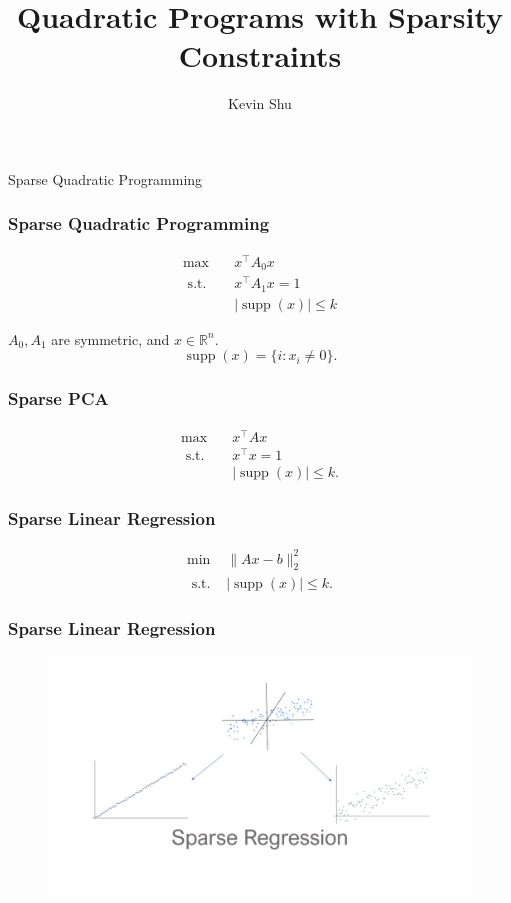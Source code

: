 \documentclass{beamer}
\title{Quadratic Programs with Sparsity Constraints}
\author{Kevin Shu\inst{1}}
\institute{\inst{1} Georgia Institute of Technology}
\date{}
\newcommand{\R}{\mathbb{R}}
\DeclareMathOperator*{\supp}{supp}
\newcommand{\st}{{\text{ s.t. }}}
\begin{document}
\frame{\titlepage}
\begin{frame}
    \centering
    \huge
    {\color{gray}Sparse Quadratic Programming}
\end{frame}
\begin{frame}
\frametitle{Sparse Quadratic Programming}
    \begin{equation}
        \begin{aligned}
            \max\quad & x^{\intercal}A_0x\\
            \st & x^{\intercal}A_1x = 1\\
                &|\supp(x)| \le k
        \end{aligned}
    \end{equation}
    \vspace{0.125in}

    $A_0, A_1$ are symmetric, and $x \in \R^n$. 
    \[
        \supp(x) = \{i : x_i \neq 0\}.
    \]

\end{frame}
\begin{frame}
    \frametitle{Sparse PCA}
    \begin{equation}
        \begin{aligned}
            \max\quad & x^{\intercal}Ax\\
            \st & x^{\intercal}x = 1\\
                &|\supp(x)| \le k.
        \end{aligned}
    \end{equation}
\end{frame}
\begin{frame}
    \frametitle{Sparse Linear Regression}
    \begin{equation}
        \begin{aligned}
        \min & \|Ax - b\|_2^2\\
        \st & |\supp(x)| \le k.
        \end{aligned}
    \end{equation}
\end{frame}
\begin{frame}
    \frametitle{Sparse Linear Regression}
    \begin{figure}[h]
        \centering
        \includegraphics[width=\linewidth]{slide3.jpg}
    \end{figure}
\end{frame}
\end{document}
